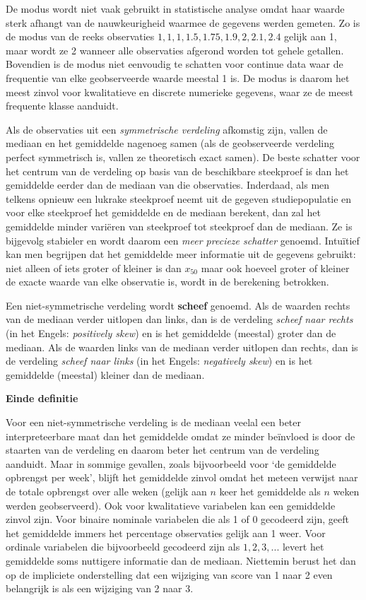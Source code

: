 \documentclass[12pt,dutch,coursenotes]{book}
\theoremstyle{definition}
\theoremstyle{definition}
\theoremstyle{definition}
\theoremstyle{remark}
\let\BeginKnitrBlock\begin \let\EndKnitrBlock\end
\begin{document}
De modus wordt niet vaak gebruikt in statistische analyse omdat haar
waarde sterk afhangt van de nauwkeurigheid waarmee de gegevens werden
gemeten. Zo is de modus van de reeks observaties
\(1, 1, 1, 1.5, 1.75, 1.9, 2, 2.1, 2.4\) gelijk aan 1, maar wordt ze 2
wanneer alle observaties afgerond worden tot gehele getallen. Bovendien
is de modus niet eenvoudig te schatten voor continue data waar de
frequentie van elke geobserveerde waarde meestal 1 is. De modus is
daarom het meest zinvol voor kwalitatieve en discrete numerieke
gegevens, waar ze de meest frequente klasse aanduidt.

Als de observaties uit een \emph{symmetrische verdeling} afkomstig zijn,
vallen de mediaan en het gemiddelde nagenoeg samen (als de geobserveerde
verdeling perfect symmetrisch is, vallen ze theoretisch exact samen). De
beste schatter voor het centrum van de verdeling op basis van de
beschikbare steekproef is dan het gemiddelde eerder dan de mediaan van
die observaties. Inderdaad, als men telkens opnieuw een lukrake
steekproef neemt uit de gegeven studiepopulatie en voor elke steekproef
het gemiddelde en de mediaan berekent, dan zal het gemiddelde minder
variëren van steekproef tot steekproef dan de mediaan. Ze is bijgevolg
stabieler en wordt daarom een \emph{meer precieze schatter} genoemd.
Intuïtief kan men begrijpen dat het gemiddelde meer informatie uit de
gegevens gebruikt: niet alleen of iets groter of kleiner is dan
\(x_{50}\) maar ook hoeveel groter of kleiner de exacte waarde van elke
observatie is, wordt in de berekening betrokken.

\BeginKnitrBlock{definition}[scheve verdeling]
\protect\hypertarget{def:unnamed-chunk-42}{}{\label{def:unnamed-chunk-42}
\iffalse (scheve verdeling) \fi{} }Een niet-symmetrische verdeling wordt
\textbf{scheef} genoemd. Als de waarden rechts van de mediaan verder
uitlopen dan links, dan is de verdeling \emph{scheef naar rechts} (in
het Engels: \emph{positively skew}) en is het gemiddelde (meestal)
groter dan de mediaan. Als de waarden links van de mediaan verder
uitlopen dan rechts, dan is de verdeling \emph{scheef naar links} (in
het Engels: \emph{negatively skew}) en is het gemiddelde (meestal)
kleiner dan de mediaan.

\textbf{Einde definitie}
\EndKnitrBlock{definition}

Voor een niet-symmetrische verdeling is de mediaan veelal een beter
interpreteerbare maat dan het gemiddelde omdat ze minder beïnvloed is
door de staarten van de verdeling en daarom beter het centrum van de
verdeling aanduidt. Maar in sommige gevallen, zoals bijvoorbeeld voor
`de gemiddelde opbrengst per week', blijft het gemiddelde zinvol omdat
het meteen verwijst naar de totale opbrengst over alle weken (gelijk aan
\(n\) keer het gemiddelde als \(n\) weken werden geobserveerd). Ook voor
kwalitatieve variabelen kan een gemiddelde zinvol zijn. Voor binaire
nominale variabelen die als 1 of 0 gecodeerd zijn, geeft het gemiddelde
immers het percentage observaties gelijk aan 1 weer. Voor ordinale
variabelen die bijvoorbeeld gecodeerd zijn als \(1, 2, 3, ...\) levert
het gemiddelde soms nuttigere informatie dan de mediaan. Niettemin
berust het dan op de impliciete onderstelling dat een wijziging van
score van 1 naar 2 even belangrijk is als een wijziging van 2 naar 3.
\end{document}
